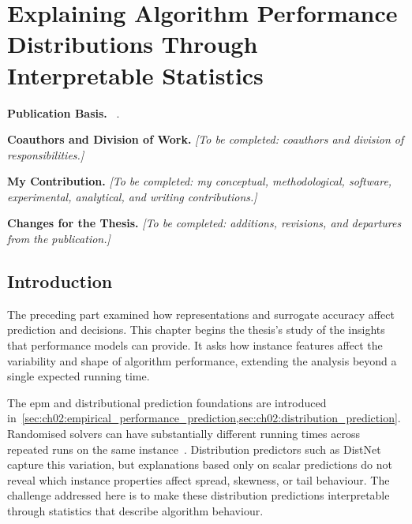 \chapter{Explaining Algorithm Performance Distributions Through Interpretable Statistics}
\label{sec:ch09:dist_explain}

\begingroup\small
\noindent\textbf{Publication Basis.} ~\citep{ShaHoo25c}.\par
\noindent\textbf{Coauthors and Division of Work.} \emph{[To be completed: coauthors and division of responsibilities.]}\par
\noindent\textbf{My Contribution.} \emph{[To be completed: my conceptual, methodological, software, experimental, analytical, and writing contributions.]}\par
\noindent\textbf{Changes for the Thesis.} \emph{[To be completed: additions, revisions, and departures from the publication.]}\par
\endgroup\medskip

\section{Introduction}
\label{sec:ch09:intro}

The preceding part examined how representations and surrogate accuracy affect prediction and decisions. This chapter begins the thesis's study of the insights that performance models can provide. It asks how instance features affect the variability and shape of algorithm performance, extending the analysis beyond a single expected running time.

The \gls{epm} and distributional prediction foundations are introduced in~\cref{sec:ch02:empirical_performance_prediction,sec:ch02:distribution_prediction}. Randomised solvers can have substantially different running times across repeated runs on the same instance~\citep{HooStu04,EggEtAl18}. Distribution predictors such as DistNet capture this variation, but explanations based only on scalar predictions do not reveal which instance properties affect spread, skewness, or tail behaviour. The challenge addressed here is to make these distribution predictions interpretable through statistics that describe algorithm behaviour.

